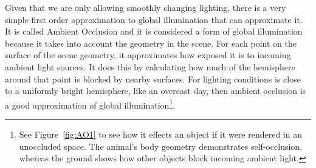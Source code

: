 \documentclass[10pt,twocolumn,letterpaper]{article}
\begin{document}
Given that we are only allowing smoothly changing lighting, there is a very simple first order approximation to global illumination that can approximate it. It is called Ambient Occlusion and it is considered a form of global illumination because it takes into account the geometry in the scene\cite{Miller:1994:EAL:192161.192244}.  For each point on the surface of the scene geometry, it approximates how exposed it is to incoming ambient light sources.  It does this by calculating how much of the hemisphere around that point is blocked by nearby surfaces. For lighting conditions is close to a uniformly bright hemisphere, like an overcast day, then ambient occlusion is a good approximation of global illumination\footnote{See Figure~\ref{fig:AO1} to see how it effects an object if it were rendered in an unoccluded space. The animal's body geometry demonstrates self-occlusion, whereas the ground shows how other objects block incoming ambient light.}.\\


\end{document}
